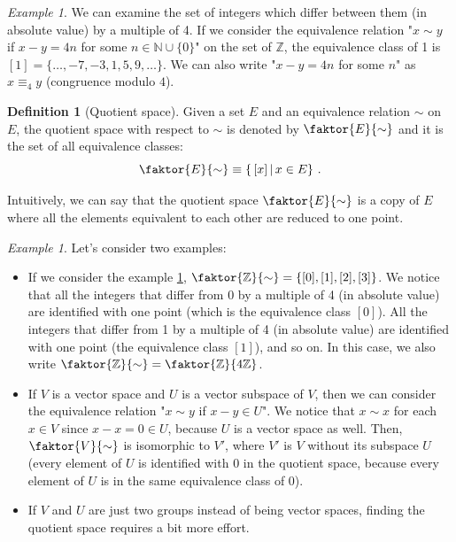 \documentclass[a4paper,11pt,titlepage, article, oneside]{memoir}
\numberwithin{equation}{section}
\theoremstyle{definition}
\newtheorem{definition}[theorem]{Definition}
\theoremstyle{remark}
\newtheorem{example}[theorem]{Example}
\begin{document}
\begin{tcolorbox}\begin{example} \label{modulo4ex}
We can examine the set of integers which differ between them (in absolute value) by a multiple of 4.
  If we consider the equivalence relation "$x \sim y$ if $x-y = 4n$ for some $n \in \mathbb{N} \cup \{0\}$" on the set of $\mathbb{Z}$, the equivalence class of 1 is $[1] = \{\ldots, -7, -3, 1, 5, 9, \ldots\}$. We can also write "$x-y = 4n$ for some $n$" as $x \equiv_4 y$ (congruence modulo $4$).
\end{example}\end{tcolorbox}

\begin{definition}[Quotient space]
  Given a set $E$ and an equivalence relation $\sim$ on $E$, the quotient space with respect to $\sim$ is denoted by $\faktor{E}{\sim}$ and it is the set of all equivalence classes:
  \begin{equation}
     \faktor{E}{\sim} \equiv \left \{ \, [x] \,|\, x \in E \right \} \, .
  \end{equation}
\end{definition}
Intuitively, we can say that the quotient space $\faktor{E}{\sim}$ is a copy of $E$ where all the elements equivalent to each other are reduced to one point.

\begin{tcolorbox}\begin{example} \label{quotientexample}
  Let's consider two examples:
  \begin{itemize}
    \item If we consider the example \ref{modulo4ex}, $\faktor{\mathbb{Z}}{\sim} = \{[0], [1], [2], [3]\}$. We notice that all the integers that differ from 0 by a multiple of 4 (in absolute value) are identified with one point (which is the equivalence class $[0]$). All the integers that differ from 1 by a multiple of 4 (in absolute value) are identified with one point (the equivalence class $[1]$), and so on. In this case, we also write $\faktor{\mathbb{Z}}{\sim} = \faktor{\mathbb{Z}}{4\mathbb{Z}}$.
    \item If $V$ is a vector space and $U$ is a vector subspace of $V$, then we can consider the equivalence relation "$x \sim y$ if $x-y \in U$". We notice that $x \sim x$ for each $x \in V$ since $x-x = 0 \in U$, because $U$ is a vector space as well. Then, $\faktor{V}{\sim}$ is isomorphic to $V'$, where $V'$ is $V$ without its subspace $U$ (every element of $U$ is identified with 0 in the quotient space, because every element of $U$ is in the same equivalence class of 0).
    \item If $V$ and $U$ are just two groups instead of being vector spaces, finding the quotient space requires a bit more effort.
  \end{itemize}
\end{example}\end{tcolorbox}
\end{document}
